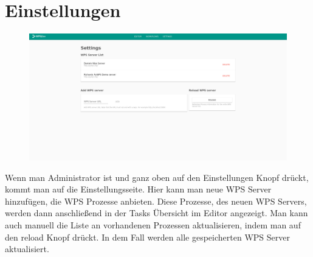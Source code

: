 \chapter{Einstellungen}
    \begin{figure}[H]
        \centering
        \includegraphics[width=15.5cm]{images/Settings.png}
        \label{settings}
    \end{figure}
    
    Wenn man Administrator ist und ganz oben auf den Einstellungen Knopf drückt, kommt man auf die Einstellungsseite. Hier kann man neue WPS Server hinzufügen, die WPS Prozesse anbieten. Diese Prozesse, des neuen WPS Servers, werden dann anschließend in der Tasks Übersicht im Editor angezeigt. Man kann auch manuell die Liste an vorhandenen Prozessen aktualisieren, indem man auf den reload Knopf drückt. In dem Fall werden alle gespeicherten WPS Server aktualisiert. 
